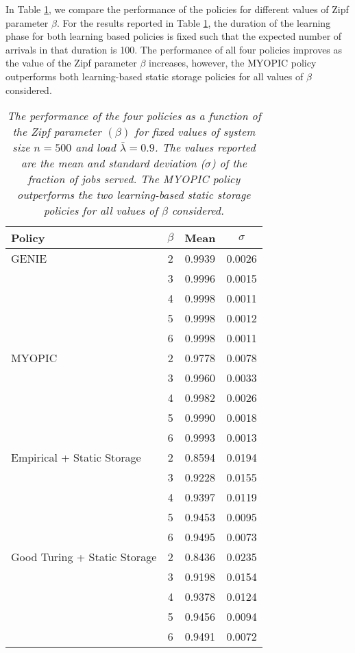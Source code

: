 \documentclass[10pt, conference, letterpaper]{IEEEtran}
\begin{document}
In Table \ref{table:diff_beta}, we compare the performance of the policies for different values of Zipf parameter $\beta$. For the results reported in Table \ref{table:diff_beta}, the duration of the learning phase for both learning based policies is fixed such that the expected number of arrivals in that duration is 100. The performance of all four policies improves as the value of the Zipf parameter $\beta$ increases, however, the MYOPIC policy outperforms both learning-based static storage policies for all values of $\beta$ considered.


\begin{table}[h]
	\centering
	\begin{tabular}{l c c c }
		\hline\hline
		Policy & $\beta$ & Mean & $\sigma$ \\ [0.5ex] \hline GENIE & 2 & 0.9939 & 0.0026 \\
		& 3 & 0.9996 & 0.0015 \\
		& 4 & 0.9998 & 0.0011 \\
		& 5 & 0.9998 & 0.0012 \\
		& 6 & 0.9998 & 0.0011 \\
		\hline
		MYOPIC & 2 & 0.9778 & 0.0078 \\
		& 3 & 0.9960 & 0.0033 \\
		& 4 & 0.9982 & 0.0026 \\
		& 5 & 0.9990 & 0.0018 \\
		& 6 & 0.9993 & 0.0013 \\
		\hline
		Empirical + Static Storage & 2 & 0.8594 & 0.0194  \\
		& 3 & 0.9228 & 0.0155 \\
		& 4 & 0.9397 & 0.0119 \\
		& 5 & 0.9453 & 0.0095 \\
		& 6 & 0.9495 & 0.0073 \\
		\hline
		Good Turing + Static Storage & 2 & 0.8436 & 0.0235  \\
		& 3 & 0.9198 & 0.0154 \\
		& 4 & 0.9378 & 0.0124 \\
		& 5 & 0.9456 & 0.0094 \\
		& 6 & 0.9491 & 0.0072 \\
		\hline
	\end{tabular}
	\caption{\sl The performance of the four policies as a function of the Zipf parameter $(\beta)$ for fixed values of system size $n = 500$ and load $\bar{\lambda} = 0.9$. The values reported are the mean and standard deviation ($\sigma$) of the fraction of jobs served. The MYOPIC policy outperforms the two learning-based static storage policies for all values of $\beta$ considered.}
	
	\label{table:diff_beta} \end{table}
\end{document}
